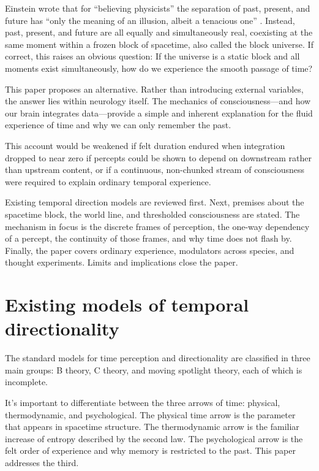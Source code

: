 \documentclass[11pt,a4paper]{article}
\begin{document}
Einstein wrote that for ``believing physicists'' the separation of past, present, and future has ``only the meaning of an illusion, albeit a tenacious one'' \citep{einstein1955besso}. Instead, past, present, and future are all equally and simultaneously real, coexisting at the same moment within a frozen block of spacetime, also called the block universe. If correct, this raises an obvious question: If the universe is a static block and all moments exist simultaneously, how do we experience the smooth passage of time?

This paper proposes an alternative. Rather than introducing external variables, the answer lies within neurology itself. The mechanics of consciousness—and how our brain integrates data—provide a simple and inherent explanation for the fluid experience of time and why we can only remember the past.

This account would be weakened if felt duration endured when integration dropped to near zero if percepts could be shown to depend on downstream rather than upstream content, or if a continuous, non-chunked stream of consciousness were required to explain ordinary temporal experience.

Existing temporal direction models are reviewed first. Next, premises about the spacetime block, the world line, and thresholded consciousness are stated. The mechanism in focus is the discrete frames of perception, the one-way dependency of a percept, the continuity of those frames, and why time does not flash by. Finally, the paper covers ordinary experience, modulators across species, and thought experiments. Limits and implications close the paper.

\section{Existing models of temporal directionality}

The standard models for time perception and directionality are classified in three main groups: B theory, C theory, and moving spotlight theory, each of which is incomplete.

It’s important to differentiate between the three arrows of time: physical, thermodynamic, and psychological. The physical time arrow is the parameter that appears in spacetime structure. The thermodynamic arrow is the familiar increase of entropy described by the second law. The psychological arrow is the felt order of experience and why memory is restricted to the past. This paper addresses the third. 
\end{document}

